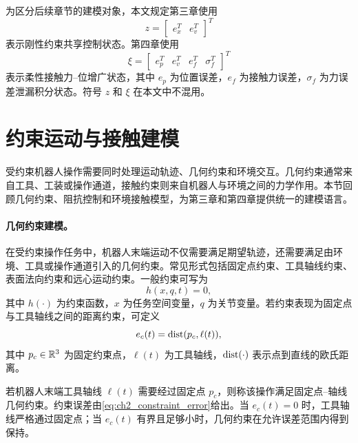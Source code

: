 \begin{definition}[全文核心状态符号]
\label{def:ch2_core_states}
为区分后续章节的建模对象，本文规定第三章使用
\begin{equation}
  z=\begin{bmatrix}e_x^T & e_v^T\end{bmatrix}^T
  \label{eq:ch2_state_z}
\end{equation}
表示刚性约束共享控制状态。第四章使用
\begin{equation}
  \xi=\begin{bmatrix}e_p^T & e_v^T & e_f^T & \sigma_f^T\end{bmatrix}^T
  \label{eq:ch2_state_xi}
\end{equation}
表示柔性接触力--位增广状态，其中 $e_p$ 为位置误差，$e_f$ 为接触力误差，$\sigma_f$ 为力误差泄漏积分状态。符号 $z$ 和 $\xi$ 在本文中不混用。
\end{definition}

\section{约束运动与接触建模}
\label{sec:ch2_constraints_contact}

受约束机器人操作需要同时处理运动轨迹、几何约束和环境交互。几何约束通常来自工具、工装或操作通道，接触约束则来自机器人与环境之间的力学作用。本节回顾几何约束、阻抗控制和环境接触模型，为第三章和第四章提供统一的建模语言。

\paragraph{几何约束建模。}
\label{subsec:ch2_geometric_constraints}

在受约束操作任务中，机器人末端运动不仅需要满足期望轨迹，还需要满足由环境、工具或操作通道引入的几何约束。常见形式包括固定点约束、工具轴线约束、表面法向约束和远心运动约束。一般约束可写为
\begin{equation}
  h(x,q,t)=0,
  \label{eq:ch2_general_constraint}
\end{equation}
其中 $h(\cdot)$ 为约束函数，$x$ 为任务空间变量，$q$ 为关节变量。若约束表现为固定点与工具轴线之间的距离约束，可定义
\begin{equation}
  e_c(t)=\operatorname{dist}(p_c,\ell(t)),
  \label{eq:ch2_constraint_error}
\end{equation}
其中 $p_c\in\mathbb{R}^3$ 为固定约束点，$\ell(t)$ 为工具轴线，$\operatorname{dist}(\cdot)$ 表示点到直线的欧氏距离。

\begin{definition}
\label{def:ch2_fixed_point_axis}
若机器人末端工具轴线 $\ell(t)$ 需要经过固定点 $p_c$，则称该操作满足固定点--轴线几何约束。约束误差由\eqref{eq:ch2_constraint_error}给出。当 $e_c(t)=0$ 时，工具轴线严格通过固定点；当 $e_c(t)$ 有界且足够小时，几何约束在允许误差范围内得到保持。
\end{definition}

